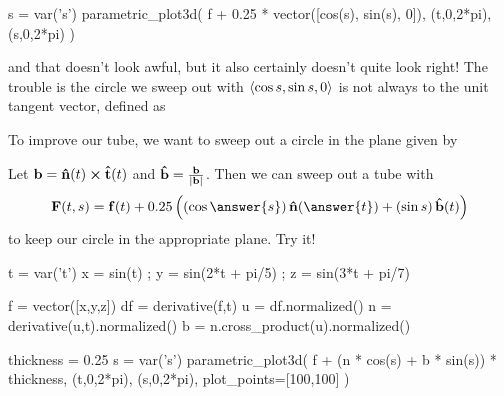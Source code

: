 \documentclass{ximera}
\begin{document}
\begin{example}
\begin{sageCell}
s = var('s')
parametric_plot3d( f + 0.25 * vector([cos(s), sin(s), 0]), (t,0,2*pi), (s,0,2*pi) )
\end{sageCell}
and that doesn't look awful, but it also certainly doesn't quite look
right!  The trouble is the circle we sweep out with
$\left\langle \cos s, \sin s, 0\right\rangle$ is not always
 to the
unit tangent vector, defined as
\begin{multipleChoice}
\end{multipleChoice}
To improve our tube, we want to sweep out a circle in the plane given by
\begin{multipleChoice}
\end{multipleChoice}
Let $\mathbf{b} = \mathbf{\hat{n}}(t) \boldsymbol\times \mathbf{\hat{t}}(t)$ and $\mathbf{\hat{b}} = \frac{\mathbf{b}}{| \mathbf{b} |}$.  Then we can sweep out a tube with
  \[
    \vec{F}(t,s) = \vec{f}(t) + 0.25 \left( \left( \cos \answer{s} \right) \unormal(\answer{t}) + \left( \sin s \right) \ubinormal(t) \right)
  \]
  to keep our circle in the appropriate plane.  Try it!
\begin{sageCell}
t = var('t')
x = sin(t) ; y = sin(2*t + pi/5) ; z = sin(3*t + pi/7)

f = vector([x,y,z])
df = derivative(f,t)
u = df.normalized()
n = derivative(u,t).normalized()
b = n.cross_product(u).normalized()

thickness = 0.25
s = var('s')
parametric_plot3d( f + (n * cos(s) + b * sin(s)) * thickness, (t,0,2*pi), (s,0,2*pi), plot_points=[100,100] )
\end{sageCell}
\end{example}  
\end{document}

